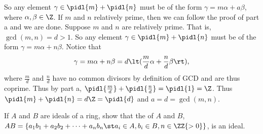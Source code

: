 \documentclass{article}
\begin{document}
\begin{solution}
\begin{enumerate}[label=\tbo{\alph*.}]
    So any element \(\gamma\in\pidl{m} + \pidl{n} \) must be of the form \( \gamma=m\alpha+a\beta \), where \( \alpha,\beta\in\Z \).
    If \( m \) and \( n \) relatively prime, then we can follow the proof of part a and we are done.
    Suppose \( m \) and \( n \) are  relatively prime. That is, \( \gcd(m,n) = d > 1\). So any element \( \gamma\in\pidl{m}+\pidl{n} \) must be of the form \( \gamma=m\alpha+n\beta \). Notice that \begin{align*}
      \gamma = m\alpha+n\beta = d\lt(\frac{m}{d}\alpha+\frac{n}{d}\beta\rt),
    \end{align*} where \( \frac{m}{d} \) and \( \frac{n}{d} \) have no common divisors by definition of GCD and are thus coprime.
    Thus by part a, \( \pidl{\frac{m}{d}}+\pidl{\frac{n}{d}}=\pidl{1}=\Z \).
    Thus \( \pidl{m}+\pidl{n} = d\Z = \pidl{d} \) and \( a = d = \gcd(m,n) \).
\end{enumerate}
\end{solution}

If \( A \) and \( B \) are ideals of a ring, show that the  of \( A \) and \( B \), \( AB = \{a_1b_1 + a_2b_2 + \cdots + a_nb_n \st a_i\in A, b_i\in B, n \in\ZZ{>0}\} \), is an ideal.
\end{document}
